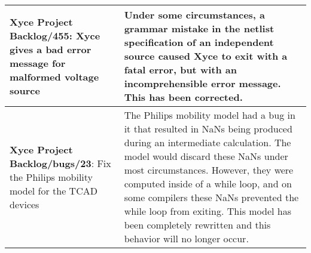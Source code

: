 {\begin{longtable}[h] {>{\raggedright\small}m{2in}|>{\raggedright\let\\\tabularnewline\small}m{3.5in}}
\textbf{Xyce Project Backlog/455}:  Xyce gives a bad error message for 
malformed voltage source & Under some circumstances, a grammar mistake 
in the netlist specification of an independent source caused Xyce to 
exit with a fatal error, but with an incomprehensible error message.  
This has been corrected.
\\ \hline

\textbf{Xyce Project Backlog/bugs/23}: 
Fix the Philips mobility model for the TCAD devices & 
The Philips mobility model had a bug in it that resulted in NaNs 
being produced during an intermediate calculation.   
The model would discard these NaNs under most circumstances. 
However, they were computed inside of a while loop, and on some compilers 
these NaNs prevented the while loop from exiting.  This model has 
been completely rewritten and this behavior will no longer occur.
\\ \hline

\end{longtable}
}
